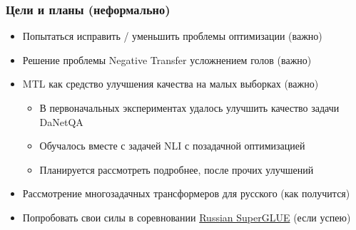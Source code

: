 \documentclass[aspectratio=169]{beamer}
\begin{document}
\begin{frame}
	\frametitle{Цели и планы (неформально)}
	\begin{itemize}
		\item Попытаться исправить / уменьшить проблемы оптимизации (важно)
		\item Решение проблемы Negative Transfer усложнением голов (важно)
		\item MTL как средство улучшения качества на малых выборках (важно)
		\begin{itemize}
			\item В первоначальных экспериментах удалось улучшить качество задачи DaNetQA 
			\item Обучалось вместе с задачей NLI с позадачной оптимизацией
			\item Планируется рассмотреть подробнее, после прочих улучшений
		\end{itemize}
		\item Рассмотрение многозадачных трансформеров для русского (как получится)
		\item Попробовать свои силы в соревновании \href{https://russiansuperglue.com/}{\color {blue} Russian SuperGLUE} (если успею)
	\end{itemize}
\end{frame}
\end{document}
